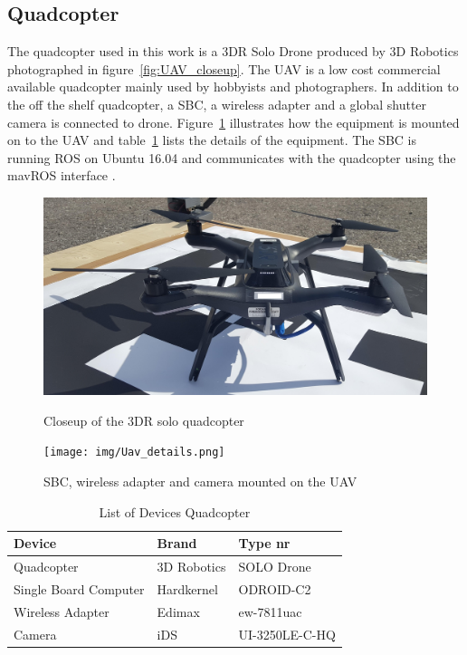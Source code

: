 \subsection{Quadcopter} %
\label{sub:quadcopter}
The quadcopter used in this work is a 3DR Solo Drone produced by 3D Robotics photographed in figure~\ref{fig:UAV_closeup}. The UAV is a low cost commercial available quadcopter mainly used by hobbyists and photographers. In addition to the off the shelf quadcopter, a \gls{SBC}, a wireless adapter and a global shutter camera is connected to drone. Figure~\ref{fig:UAV_details} illustrates how the equipment is mounted on to the UAV and table~\ref{tab:partListquadcopter} lists the details of the equipment. The \gls{SBC} is running \gls{ROS} on Ubuntu 16.04 and communicates with the quadcopter using the mavROS interface \citep{mavros}.
\begin{figure}[!htb]
\centering
  \begin{minipage}{.54\textwidth}
    \centering
    \includegraphics[width=\linewidth]{img/UAV_closeup.jpeg}
    \caption{Closeup of the 3DR solo quadcopter}
    \label{fig:UAV_closeup}
  \end{minipage}%
  \hfill
  \begin{minipage}{.44\textwidth}
    \centering
    \texttt{[image: img/Uav\_details.png]}
    \caption{SBC, wireless adapter and camera mounted on the UAV}
    \label{fig:UAV_details}
  \end{minipage}
\end{figure}
\begin{table}[!htb]
  \centering
  \begin{tabular}{l l l}
    \toprule
    \textbf{Device}&\textbf{Brand}&\textbf{Type nr}\\ \hline
    Quadcopter&3D Robotics&SOLO Drone\\
    Single Board Computer&Hardkernel&ODROID-C2\\
    Wireless Adapter&Edimax&ew-7811uac\\
    Camera&iDS&UI-3250LE-C-HQ\\
    \bottomrule
  \end{tabular}
  \caption{List of Devices Quadcopter}
  \label{tab:partListquadcopter}
\end{table}


